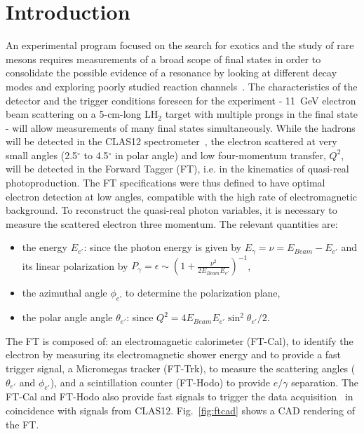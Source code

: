\section{Introduction}

An experimental program focused on the search for exotics and the study of rare mesons requires measurements
of a broad scope of final states in order to consolidate the possible evidence of a resonance by looking at different
decay modes and exploring poorly studied reaction channels~\cite{mesonex}. The characteristics of the detector
and the trigger conditions foreseen for the experiment - 11~GeV electron beam scattering on a 5-cm-long LH$_2$
target with multiple prongs in the final state - will allow  measurements of many final states simultaneously. While
the hadrons will be detected in the CLAS12 spectrometer~\cite{overview}, the electron scattered at very small
angles (2.5$^\circ$ to 4.5$^\circ$ in polar angle) and low four-momentum transfer, $Q^2$,  will be detected in the
Forward Tagger (FT), i.e. in the kinematics of quasi-real photoproduction. The FT  specifications were thus defined
to have optimal electron detection at low angles, compatible with the high rate of electromagnetic background. To
reconstruct the  quasi-real photon variables, it is necessary to measure the scattered electron three momentum.
The relevant quantities are:

\begin{itemize}
\item the energy $E_{e'}$: since the photon energy is given by $E_\gamma =\nu=E_{Beam}-E_{e'}$ and its linear
  polarization by $P_\gamma=\epsilon\sim\left( 1+\frac{\nu^2}{2 E_{Beam} E_{e'}}\right)^{-1}$,
\item the azimuthal angle $\phi_{e'}$ to determine the polarization plane, 
\item the polar angle angle $\theta_{e'}$: since $Q^2 = 4 E_{Beam} E_{e'} \sin^2{\theta_{e'}/2}$.
\end{itemize}

The FT is composed of: an electromagnetic calorimeter  (FT-Cal), to identify the electron by measuring its
electromagnetic shower energy and to provide a fast trigger signal, a Micromegas tracker (FT-Trk), to measure
the scattering angles ($\theta_{e'}$ and $\phi_{e'}$), and a  scintillation counter
(FT-Hodo) to provide $e/\gamma$ separation. The FT-Cal and FT-Hodo also provide fast signals to trigger the data acquisition~\cite{daq} in coincidence with signals from CLAS12. Fig.~\ref{fig:ftcad} shows a CAD rendering of the FT.

